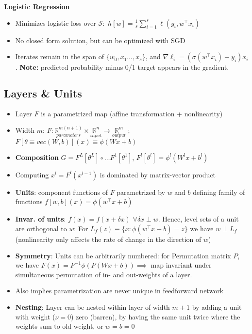 \textbf{Logistic Regression}
\begin{itemize}
    \item Minimizes logistic loss over \(\mathcal{S}:\) \(h[w] =\frac{1}{s}\sum_{i=1}^{s}\ell(y_i,w^\top x_i)\)
    \item No closed form solution, but can be optimized with SGD
    \item Iterates remain in the span of \(\{w_0,x_1\dots,x_s\}\), and  \(\nabla \ell_i =(\sigma(w^\top x_i) - y_i)x_i\). \textbf{Note:} predicted probability minus 0/1 target appears in the gradient.
\end{itemize}
\subsection{Layers \& Units}
\begin{itemize}
    \item Layer \(F\) is a parametrized map (affine transformation + nonlinearity)
    \item  Width $m$: \(F:\underset{parameters}{\mathbb{R}^{m(n+1)}}\times \underset{input}{\mathbb{R}^n} \rightarrow \underset{output}{\mathbb{R}^m}\) ; \(F[\theta\equiv vec(W,b)](x) \equiv \phi(Wx+b)\)
    \item \textbf{Composition} \(G = F^L[\theta^L] \circ \dots F^1[\theta^1]\), \(F^l[\theta^l]=\phi^l(W^lx+b^l)\)
    \item Computing \(x^l =F^l(x^{l-1})\) is dominated by matrix-vector product
    \item \textbf{Units}: component functions of \(F\) parametrized by \(w\) and \(b\) defining family of functions \(f[w,b](x)=\phi(w^\top x+b)\)
    \item \textbf{Invar. of units}: \(f(x) = f(x+\delta x)\) \(\forall \delta x \perp w\). Hence, level sets of a unit are orthogonal to $w$: For \(L_f(z) \equiv \{x:\phi(w^\top x+b)=z\}\) we have  \(w \perp L_f\) (nonlinearity only affects the rate of change in the direction of $w$)
    \item \textbf{Symmetry}: Units can be arbitrarily numbered: for Permutation matrix \(P\), we have \(F(x)=P^{-1}\phi(P(Wx+b))\implies\) map invariant under simultaneous permutation of in- and out-weights of a layer.
    \item Also implies parametrization are never unique in feedforward network
    \item \textbf{Nesting}: Layer can be nested within layer of width $m+1$ by adding a unit with weight (\(\nu =0\)) zero (barren), by having the same unit twice where the weights sum to old weight, or \(w=b=0\)
\end{itemize}
